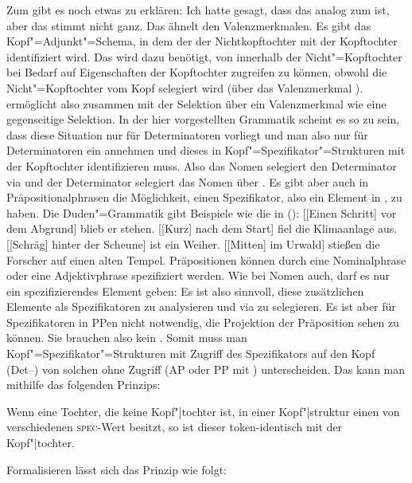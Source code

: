 \noindent
Zum \specw gibt es noch etwas zu erklären: Ich hatte gesagt, dass das \specm analog zum \modm ist,
aber das stimmt nicht ganz. Das \modm ähnelt den Valenzmerkmalen. Es gibt das Kopf"=Adjunkt"=Schema,
in dem der \modw der Nichtkopftochter mit der Kopftochter identifiziert wird. Das \specm wird dazu
benötigt, von innerhalb der Nicht"=Kopftochter bei Bedarf auf Eigenschaften der Kopftochter
zugreifen zu können, obwohl die Nicht"=Kopftochter vom Kopf selegiert wird (\zb über das
Valenzmerkmal \spr). \spec ermöglicht also zusammen mit der Selektion über ein Valenzmerkmal wie \spr eine
gegenseitige Selektion. In der hier vorgestellten Grammatik scheint es so zu sein, dass diese Situation nur
für Determinatoren vorliegt und man also nur für Determinatoren ein \specm annehmen und dieses in
Kopf"=Spezifikator"=Strukturen mit der Kopftochter identifizieren muss. Also das Nomen selegiert den
Determinator via \spr und der Determinator selegiert das Nomen über \spec. Es gibt aber auch in
Präpositionalphrasen die Möglichkeit, einen Spezifikator, also ein Element in \spr, zu haben. Die Duden"=Grammatik \citeyearpar[\S 1300]{Duden2005} gibt Beispiele wie die in ():
\eal
\ex {}[[Einen Schritt] vor dem Abgrund] blieb er stehen.\label{Beispiel-Schritt-vor-dem-Abgrund}
\ex {}[[Kurz] nach dem Start] fiel die Klimaanlage aus.
\ex {}[[Schräg] hinter der Scheune] ist ein Weiher.
\ex {}[[Mitten] im Urwald] stießen die Forscher auf einen alten Tempel.
\zl
Präpositionen können durch eine Nominalphrase oder eine Adjektivphrase spezifiziert werden. Wie bei
Nomen auch, darf es nur ein spezifizierendes Element geben:
\eal
{}
\zl
Es ist also sinnvoll, diese zusätzlichen Elemente als Spezifikatoren zu analysieren und via \spr zu
selegieren. Es ist aber für Spezifikatoren in PPen nicht notwendig, die Projektion der Präposition
sehen zu können. Sie brauchen also kein \specm. Somit muss man Kopf"=Spezifikator"=Strukturen mit Zugriff
des Spezifikators auf den Kopf (Det–\nbar) von solchen ohne Zugriff (AP oder PP mit \pbar)
unterscheiden. Das kann man mithilfe das folgenden Prinzips: 

\begin{prinzip-break} 
\label{prinzip-spec}
Wenn eine Tochter, die keine Kopf"|tochter ist, in einer Kopf"|struktur
einen von  verschiedenen \textsc{spec}-Wert besitzt, so ist dieser token-identisch mit
der Kopf"|tochter.
\end{prinzip-break}
Formalisieren lässt sich das Prinzip wie folgt:
\ea
{} \impl\\
\mbox{}\hfill{}
\z


